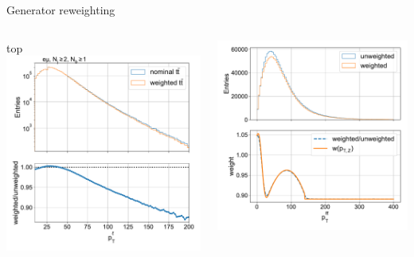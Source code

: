 \begin{frame}{Generator reweighting}
\begin{columns}
        \begin{block}{top \pt}
            \includegraphics[width=\textwidth]{chapters/Analysis/sectionCalibration/figures/generator/top_pt_weight.pdf}
        \end{block}
        \begin{block}{\PZ \pt}
            \includegraphics[width=\textwidth]{chapters/Analysis/sectionCalibration/figures/generator/z_pt_weighting.pdf}

\end{block}
\end{columns}
\end{frame}
